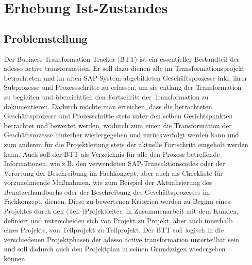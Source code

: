 \section{Erhebung Ist-Zustandes}

\subsection{Problemstellung}
Der Business Transformation Tracker (BTT) ist ein essentieller Bestandteil der adesso active transformation. Er soll dazu dienen alle im Transformationsprojekt betrachteten und im alten SAP-System abgebildeten Geschäftsprozesse inkl. ihrer Subprozesse und Prozessschritte zu erfassen, um sie entlang der Transformation zu begleiten und übersichtlich den Fortschritt der Transformation zu dokumentieren. Dadurch möchte man erreichen, dass die betrachteten Geschäftsprozesse und Prozesschritte stets unter den selben Gesichtspunkten betrachtet und bewertet werden, wodurch zum einen die Transformation der Geschäftsrozesse hinterher wiedergegeben und zurückverfolgt werden kann und zum anderen für die Projektleitung stets der aktuelle Fortschritt eingeholt werden kann. Auch soll der BTT als Verzeichnis für alle den Prozess betreffende Informationen, wie z.B. den verwendeten SAP-Transaktionscodes oder der Verortung der Beschreibung im Fachkonzept, aber auch als Checkliste für vorzunehmende Maßnahmen, wie zum Beispiel der Aktualisierung des Benutzerhandbuchs oder der Beschreibung des Geschäftsprozesses im Fachkonzept, dienen. Diese zu bewertenen Kriterien werden zu Beginn eines Projektes durch den (Teil-)Projektleiter, in Zusammenarbeit mit dem Kunden, definiert und unterscheiden sich von Projekt zu Projekt, aber auch innerhalb eines Projekts, von Teilprojekt zu Teilprojekt. Der BTT soll logisch in die verschiedenen Projektphasen der adesso active transformation unterteilbar sein und soll dadurch auch den Projektplan in seinen Grundzügen wiedergeben können.


